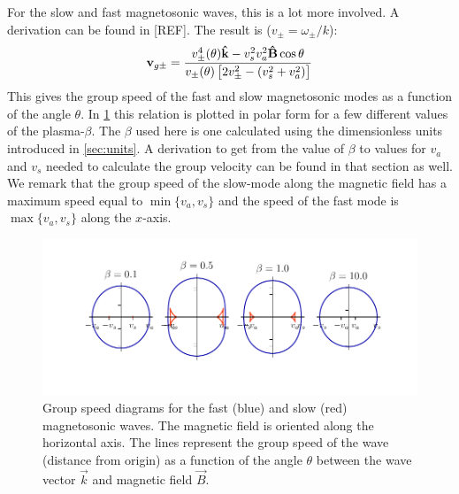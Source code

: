 For the slow and fast magnetosonic waves, this is a lot more involved. A derivation can be found in  [REF].
The result is ($v_\pm=\omega_\pm/k$):
\begin{equation}
	\mathbf{v}_{g\pm} = \frac{v_\pm^4(\theta)\mathbf{\hat{k}} - v_s^2v_a^2\mathbf{\hat{B}}\cos\theta}{v_\pm(\theta) \left[ 2v_\pm^2-(v_s^2+v_a^2) \right]}
	\label{eq:magnetoaccoustic-group-speed}
\end{equation}
This gives the group speed of the fast and slow magnetosonic modes as a function of the angle $\theta$.
In \cref{fig:MHD-group-speed} this relation is plotted in polar form for a few different values of the plasma-$\beta$.
The $\beta$ used here is one calculated using the dimensionless units introduced in \cref{sec:units}. 
A derivation to get from the value of $\beta$ to values for $v_a$ and $v_s$ needed to calculate the group velocity can be found in that section as well.
We remark that the group speed of the slow-mode along the magnetic field has a maximum speed equal to $\min\{v_a,v_s\}$ and the speed of the fast mode is $\max\{v_a,v_s\}$ along the $x$-axis.

\begin{figure}[H]
	\centering
	\includegraphics[width=\linewidth]{images/MHD-group-speed.pdf}
	\caption{Group speed diagrams for the fast (blue) and slow (red) magnetosonic waves. The magnetic field is oriented along the horizontal axis. The lines represent the group speed of the wave (distance from origin) as a function of the angle $\theta$ between the wave vector $\vec{k}$ and magnetic field $\vec{B}$.}
	\label{fig:MHD-group-speed}
\end{figure}








